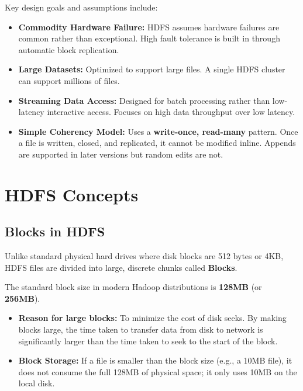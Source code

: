 \documentclass[12pt,a4paper]{article}
\begin{document}
Key design goals and assumptions include:
\begin{itemize}[leftmargin=*, itemsep=3pt]
  \item \textbf{Commodity Hardware Failure:} HDFS assumes hardware failures are common rather than exceptional. High fault tolerance is built in through automatic block replication.
  \item \textbf{Large Datasets:} Optimized to support large files. A single HDFS cluster can support millions of files.
  \item \textbf{Streaming Data Access:} Designed for batch processing rather than low-latency interactive access. Focuses on high data throughput over low latency.
  \item \textbf{Simple Coherency Model:} Uses a \textbf{write-once, read-many} pattern. Once a file is written, closed, and replicated, it cannot be modified inline. Appends are supported in later versions but random edits are not.
\end{itemize}

\section{HDFS Concepts}

\subsection{Blocks in HDFS}
Unlike standard physical hard drives where disk blocks are 512 bytes or 4KB, HDFS files are divided into large, discrete chunks called \textbf{Blocks}.

\begin{tcolorbox}[formulabox, title={HDFS Block Size Properties}]
  The standard block size in modern Hadoop distributions is \textbf{128MB} (or \textbf{256MB}).
  \begin{itemize}[leftmargin=*, noitemsep]
    \item \textbf{Reason for large blocks:} To minimize the cost of disk seeks. By making blocks large, the time taken to transfer data from disk to network is significantly larger than the time taken to seek to the start of the block.
    \item \textbf{Block Storage:} If a file is smaller than the block size (e.g., a 10MB file), it does not consume the full 128MB of physical space; it only uses 10MB on the local disk.
  \end{itemize}
\end{tcolorbox}
\end{document}
